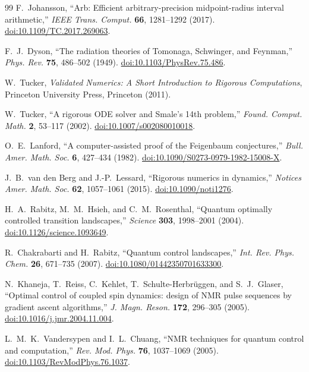\documentclass[11pt]{article}
\begin{document}
\begin{thebibliography}{99}
F.~Johansson,
``Arb: Efficient arbitrary-precision midpoint-radius interval
arithmetic,''
\emph{IEEE Trans. Comput.} \textbf{66}, 1281--1292 (2017).
\href{https://doi.org/10.1109/TC.2017.269063}
{doi:10.1109/TC.2017.269063}.

F.~J.~Dyson,
``The radiation theories of Tomonaga, Schwinger, and Feynman,''
\emph{Phys. Rev.} \textbf{75}, 486--502 (1949).
\href{https://doi.org/10.1103/PhysRev.75.486}
{doi:10.1103/PhysRev.75.486}.

W.~Tucker,
\emph{Validated Numerics: A Short Introduction to Rigorous Computations},
Princeton University Press, Princeton (2011).

W.~Tucker,
``A rigorous ODE solver and Smale's 14th problem,''
\emph{Found. Comput. Math.} \textbf{2}, 53--117 (2002).
\href{https://doi.org/10.1007/s002080010018}
{doi:10.1007/s002080010018}.

O.~E.~Lanford,
``A computer-assisted proof of the Feigenbaum conjectures,''
\emph{Bull. Amer. Math. Soc.} \textbf{6}, 427--434 (1982).
\href{https://doi.org/10.1090/S0273-0979-1982-15008-X}
{doi:10.1090/S0273-0979-1982-15008-X}.

J.~B.~van den Berg and J.-P.~Lessard,
``Rigorous numerics in dynamics,''
\emph{Notices Amer. Math. Soc.} \textbf{62}, 1057--1061 (2015).
\href{https://doi.org/10.1090/noti1276}
{doi:10.1090/noti1276}.

H.~A.~Rabitz, M.~M.~Hsieh, and C.~M.~Rosenthal,
``Quantum optimally controlled transition landscapes,''
\emph{Science} \textbf{303}, 1998--2001 (2004).
\href{https://doi.org/10.1126/science.1093649}
{doi:10.1126/science.1093649}.

R.~Chakrabarti and H.~Rabitz,
``Quantum control landscapes,''
\emph{Int. Rev. Phys. Chem.} \textbf{26}, 671--735 (2007).
\href{https://doi.org/10.1080/01442350701633300}
{doi:10.1080/01442350701633300}.

N.~Khaneja, T.~Reiss, C.~Kehlet, T.~Schulte-Herbr\"uggen, and S.~J.~Glaser,
``Optimal control of coupled spin dynamics: design of NMR pulse sequences
by gradient ascent algorithms,''
\emph{J. Magn. Reson.} \textbf{172}, 296--305 (2005).
\href{https://doi.org/10.1016/j.jmr.2004.11.004}
{doi:10.1016/j.jmr.2004.11.004}.

L.~M.~K.~Vandersypen and I.~L.~Chuang,
``NMR techniques for quantum control and computation,''
\emph{Rev. Mod. Phys.} \textbf{76}, 1037--1069 (2005).
\href{https://doi.org/10.1103/RevModPhys.76.1037}
{doi:10.1103/RevModPhys.76.1037}.


\end{thebibliography}
\end{document}

